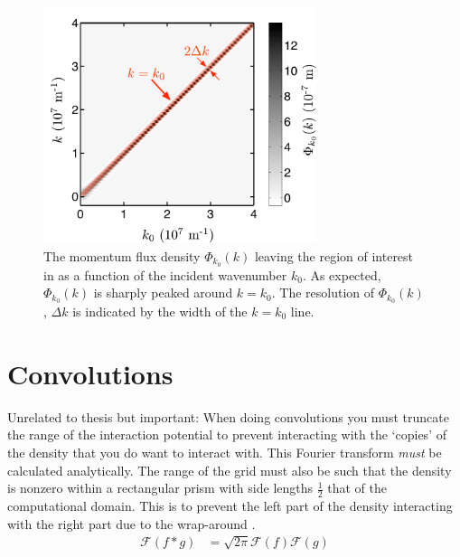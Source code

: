 \begin{figure}
    \centering
    \includegraphics[width=8cm]{PhiAccuracy}
    \caption{\label{MethodsAppendix:PhiAccuracy} The momentum flux density $\Phi_{k_0}(k)$ leaving the region of interest in  as a function of the incident wavenumber $k_0$. As expected, $\Phi_{k_0}(k)$ is sharply peaked around $k=k_0$. The resolution of $\Phi_{k_0}(k)$, $\Delta k$ is indicated by the width of the $k=k_0$ line.}
\end{figure}


\section{Convolutions}
Unrelated to thesis but important: When doing convolutions you must truncate the range of the interaction potential to prevent interacting with the `copies' of the density that you do want to interact with. This Fourier transform \emph{must} be calculated analytically. The range of the grid must also be such that the density is nonzero within a rectangular prism with side lengths $\frac{1}{2}$ that of the computational domain. This is to prevent the left part of the density interacting with the right part due to the wrap-around \citep{Ronen:2006}.
\begin{align}
    \mathcal{F}(f * g) &= \sqrt{2 \pi} \mathcal{F}(f) \mathcal{F}(g)
\end{align}
